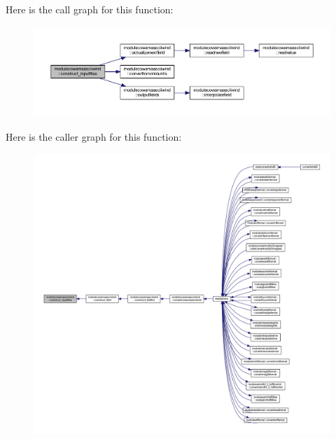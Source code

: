 Here is the call graph for this function\+:\nopagebreak
\begin{figure}[H]
\begin{center}
\leavevmode
\includegraphics[width=350pt]{namespacemodulecowamaasciiwind_ab2311b5176ff0df25428cb105c33cf81_cgraph}
\end{center}
\end{figure}
Here is the caller graph for this function\+:\nopagebreak
\begin{figure}[H]
\begin{center}
\leavevmode
\includegraphics[width=350pt]{namespacemodulecowamaasciiwind_ab2311b5176ff0df25428cb105c33cf81_icgraph}
\end{center}
\end{figure}
\mbox{\label{namespacemodulecowamaasciiwind_a1fde1515d3a9c4b1b2737393842f1f39}} 
